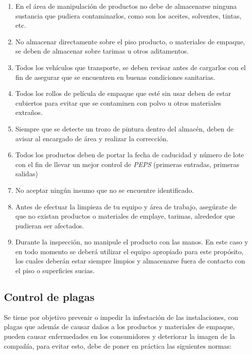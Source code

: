 \begin{enumerate}
	\item En el área de manipulación de productos no debe de almacenarse ninguna sustancia que pudiera contaminarlos, como son los aceites, solventes, tintas, etc.
	\item No almacenar directamente sobre el piso producto, o materiales de empaque, se deben de almacenar sobre tarimas u otros aditamentos.
	\item Todos los vehículos que transporte, se deben revisar antes de cargarlos con el fin de asegurar que se encuentren en buenas condiciones sanitarias.
	\item Todos los rollos de película de empaque que esté sin usar deben de estar cubiertos para evitar que se contaminen con polvo u otros materiales extraños.
	\item Siempre que se detecte un trozo de pintura dentro del almacén, deben de avisar al encargado de área y realizar la corrección.
	\item Todos los productos deben de portar la fecha de caducidad y número de lote con el fin de llevar un mejor control de \textit{PEPS} (primeras entradas, primeras salidas)
	\item No aceptar ningún insumo que no se encuentre identificado.
	\item Antes de efectuar la limpieza de tu equipo y área de trabajo, asegúrate de que no existan productos o materiales de emplaye, tarimas, alrededor que pudieran ser afectados.
	\item Durante la inspección, no manipule el producto con las manos. En este caso y en todo momento se deberá utilizar el equipo apropiado para este propósito, los cuales deberán estar siempre limpios y almacenarse fuera de contacto con el piso o superficies sucias.
\end{enumerate}

\subsection{Control de plagas}

Se tiene por objetivo prevenir o impedir la infestación de las instalaciones, con plagas que además de causar daños a los productos y materiales de empaque, pueden causar enfermedades en los consumidores y deteriorar la imagen de la compañía, para evitar esto, debe de poner en práctica las siguientes normas:

